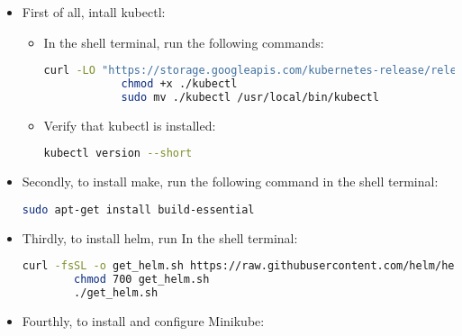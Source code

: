 \begin{itemize}
	\item First of all, intall kubectl:

	\begin{itemize}
		\item In the shell terminal, run the following commands:	
		\begin{lstlisting}[language=bash]
			curl -LO "https://storage.googleapis.com/kubernetes-release/release/$(curl -s https://storage.googleapis.com/kubernetes-release/release/stable.txt)/bin/linux/amd64/kubectl"
			chmod +x ./kubectl
			sudo mv ./kubectl /usr/local/bin/kubectl
		\end{lstlisting}

		\item Verify that kubectl is installed:
		\begin{lstlisting}[language=bash]
			kubectl version --short
		\end{lstlisting}
	\end{itemize}

	\item Secondly, to install make, run the following command in the shell terminal:
	\begin{lstlisting}[language=bash]
		sudo apt-get install build-essential
	\end{lstlisting}
	
	\item Thirdly, to install helm, run In the shell terminal:
	\begin{lstlisting}[language=bash]
		curl -fsSL -o get_helm.sh https://raw.githubusercontent.com/helm/helm/main/scripts/get-helm-3
		chmod 700 get_helm.sh
		./get_helm.sh
	\end{lstlisting}

	\item Fourthly, to install and configure Minikube:


\end{itemize}
